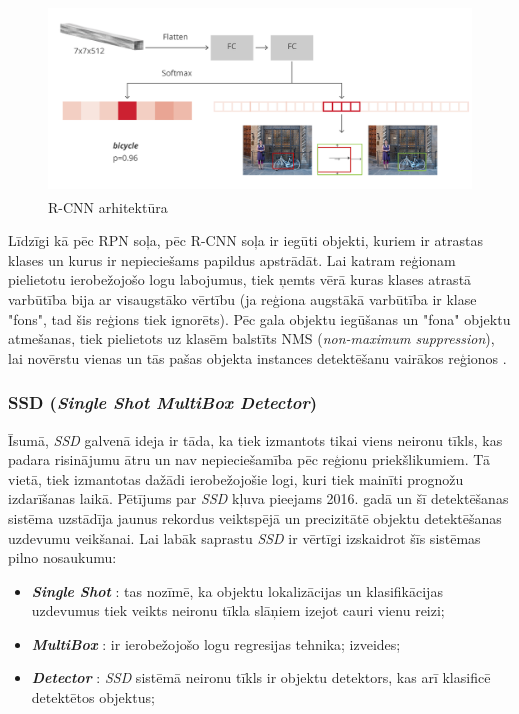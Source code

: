 \begin{figure}[H]%
	\centering
	\includegraphics[height=5cm]{images/rcnnarch.png} %
	\caption{R-CNN arhitektūra \cite{fasterrcnn}}%
	\label{fig:example}%
\end{figure}

Līdzīgi kā pēc RPN soļa, pēc R-CNN soļa ir iegūti objekti, kuriem ir atrastas klases un kurus ir nepieciešams papildus apstrādāt. Lai  katram reģionam pielietotu ierobežojošo logu labojumus, tiek ņemts vērā kuras klases atrastā varbūtība bija ar visaugstāko vērtību (ja reģiona augstākā varbūtība ir klase "fons", tad šis reģions tiek ignorēts). Pēc gala objektu iegūšanas un "fona" objektu atmešanas, tiek pielietots uz klasēm balstīts NMS (\textit{non-maximum suppression}), lai novērstu vienas un tās pašas objekta instances detektēšanu vairākos reģionos \cite{hosang2017learning}.

\subsubsection{SSD (\textit{Single Shot MultiBox Detector})}

Īsumā, \textit{SSD} galvenā ideja ir tāda, ka tiek izmantots tikai viens neironu tīkls, kas padara risinājumu ātru un nav nepieciešamība pēc reģionu priekšlikumiem. Tā vietā, tiek izmantotas dažādi ierobežojošie logi, kuri tiek mainīti prognožu izdarīšanas laikā. Pētījums par \textit{SSD} kļuva pieejams 2016. gadā \cite{liu2016ssd} un šī detektēšanas sistēma uzstādīja jaunus rekordus veiktspējā un precizitātē objektu detektēšanas uzdevumu veikšanai. Lai labāk saprastu \textit{SSD} ir vērtīgi izskaidrot šīs sistēmas pilno nosaukumu:
\begin{itemize}
	\item \textit{\textbf{Single Shot}} : tas nozīmē, ka objektu lokalizācijas un klasifikācijas uzdevumus tiek veikts neironu tīkla slāņiem izejot cauri vienu reizi;
	\item \textit{\textbf{MultiBox}} : ir ierobežojošo logu regresijas tehnika; izveides;
	\item  \textit{\textbf{Detector}} : \textit{SSD} sistēmā neironu tīkls ir objektu detektors, kas arī klasificē detektētos objektus;
\end{itemize}

